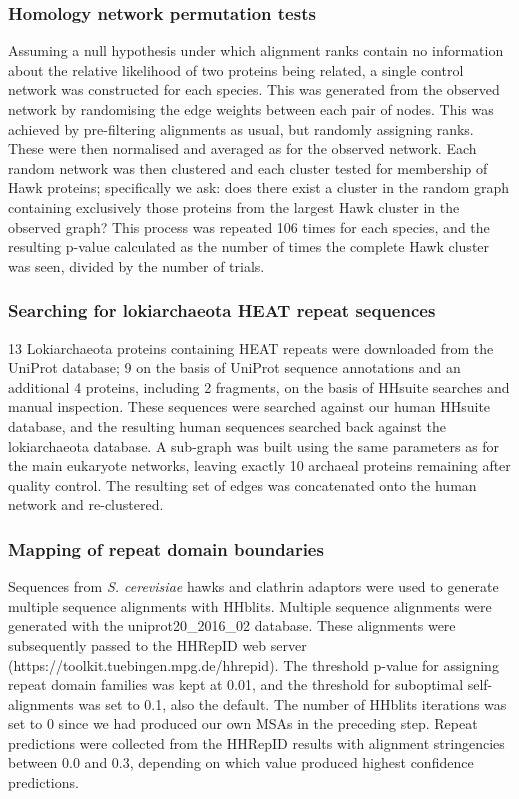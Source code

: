 \documentclass[a4paper,11pt,twoside,openright]{scrbook}
\begin{document}
\subsubsection{Homology network permutation tests}
Assuming a null hypothesis under which alignment ranks contain no information about the relative likelihood of two proteins being related, a single control network was constructed for each species. This was generated from the observed network by randomising the edge weights between each pair of nodes. This was achieved by pre-filtering alignments as usual, but randomly assigning ranks. These were then normalised and averaged as for the observed network. Each random network was then clustered and each cluster tested for membership of Hawk proteins; specifically we ask: does there exist a cluster in the random graph containing exclusively those proteins from the largest Hawk cluster in the observed graph? This process was repeated 106 times for each species, and the resulting p-value calculated as the number of times the complete Hawk cluster was seen, divided by the number of trials.

\subsubsection{Searching for lokiarchaeota HEAT repeat sequences}
13 Lokiarchaeota proteins containing HEAT repeats were downloaded from the UniProt database; 9 on the basis of UniProt sequence annotations and an additional 4 proteins, including 2 fragments, on the basis of HHsuite searches and manual inspection. These sequences were searched against our human HHsuite database, and the resulting human sequences searched back against the lokiarchaeota database. A sub-graph was built using the same parameters as for the main eukaryote networks, leaving exactly 10 archaeal proteins remaining after quality control. The resulting set of edges was concatenated onto the human network and re-clustered.

\subsubsection{Mapping of repeat domain boundaries}
Sequences from \textit{S. cerevisiae} hawks and clathrin adaptors were used to generate multiple sequence alignments with HHblits. Multiple sequence alignments were generated with the uniprot20\_2016\_02 database. These alignments were subsequently passed to the HHRepID web server \newline (https://toolkit.tuebingen.mpg.de/hhrepid). The threshold p-value for assigning repeat domain families was kept at 0.01, and the threshold for suboptimal self-alignments was set to 0.1, also the default. The number of HHblits iterations was set to 0 since we had produced our own MSAs in the preceding step. Repeat predictions were collected from the HHRepID results with alignment stringencies between 0.0 and 0.3, depending on which value produced highest confidence predictions.
\end{document}
